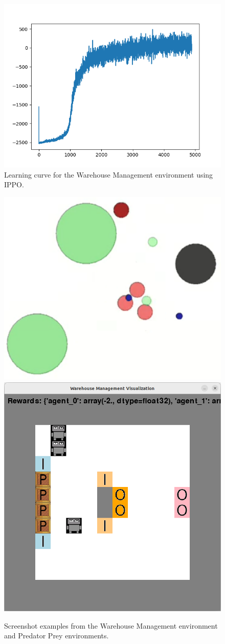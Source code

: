 \documentclass[conference]{IEEEtran}
\begin{document}
\begin{figure}
    \centering
    \includegraphics[width=\linewidth]{figures/wm_learning_curve.png}
    \caption{Learning curve for the Warehouse Management environment using IPPO.}
    \label{fig:wm_learning_curve}
\end{figure}

\begin{figure}
    \centering
    \includegraphics[width=0.4\linewidth]{figures/screenshot_1.png}
    \includegraphics[width=0.4\linewidth]{figures/wm_screenshot.png}
    \caption{Screenshot examples from the Warehouse Management environment and Predator Prey environments.}
    \label{fig:env_screenshots}
\end{figure}
\end{document}
